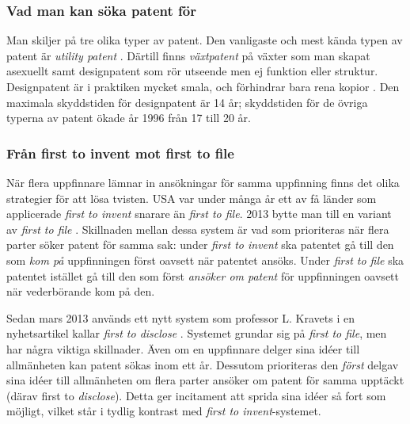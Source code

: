 \subsubsection{Vad man kan söka patent för}

Man skiljer på tre olika typer av patent. Den vanligaste och mest kända typen av patent är \emph{utility patent} \cite{cmu-overview}.
Därtill finns \emph{växtpatent} på växter som man skapat asexuellt samt designpatent som rör utseende men ej funktion eller struktur. Designpatent är i praktiken mycket smala, och förhindrar bara rena kopior . Den maximala skyddstiden för designpatent är 14 år; skyddstiden för de övriga typerna av patent ökade år 1996 från 17 till 20 år.


\subsubsection{Från first to invent mot first to file} 

När flera uppfinnare lämnar in ansökningar för samma uppfinning finns det olika strategier för att lösa tvisten. USA var under många år ett av få länder som applicerade \emph{first to invent} snarare än \emph{first to file}. 2013 bytte man till en variant av \emph{first to file} \cite{leahy}.%
Skillnaden mellan dessa system är vad som prioriteras när flera parter söker patent för samma sak: under \emph{first to invent} ska patentet gå till den som \emph{kom på} uppfinningen först oavsett när patentet ansöks. Under \emph{first to file} ska patentet istället gå till den som först \emph{ansöker om patent} för uppfinningen oavsett när vederbörande kom på den. 

Sedan mars 2013 används ett nytt system som professor L. Kravets i en nyhetsartikel kallar \emph{first to disclose} \cite{kravets}. Systemet grundar sig på \emph{first to file}, men har några viktiga skillnader. Även om en uppfinnare delger sina idéer till allmänheten kan patent sökas inom ett år. Dessutom prioriteras den \emph{först} delgav sina idéer till allmänheten om flera parter ansöker om patent för samma upptäckt (därav first to \emph{disclose}). Detta ger incitament att sprida sina idéer så fort som möjligt, vilket står i tydlig kontrast med \emph{first to invent}-systemet.


